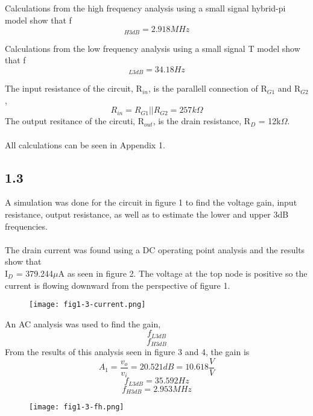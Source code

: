  Calculations from the high frequency analysis using a small signal hybrid-pi model show that f$$_{H 3dB} = 2.918MHz$$

  Calculations from the low frequency analysis using a small signal T model show that f$$_{L 3dB} = 34.18Hz$$

  The input resistance of the circuit, R$_{in}$, is the parallell connection of R$_{G1}$ and R$_{G2}$, $$R_{in} = R_{G1}||R_{G2} = 257k\Omega$$
  The output resitance of the circuti, R$_{out}$, is the drain resistance, R$_D$ = 12k$\Omega$.\\\\

  All calculations can be seen in Appendix 1.\\
\pagebreak
\subsection*{1.3}

  A simulation was done for the circuit in figure 1 to find the voltage gain, input resistance, output resistance, as well as to estimate the lower and upper 3dB frequencies.\\\\

  The drain current was found using a DC operating point analysis and the results show that \\I$_D$ = 379.244$\mu$A as seen in figure 2. The voltage at the top node is positive so the current is flowing downward from the perspective of figure 1.\\

  \begin{figure}[h!]
        \centering
        \texttt{[image: fig1-3-current.png]}
  \end{figure}

\pagebreak

  An AC analysis was used to find the gain, $$f_{L 3dB}$$ $$f_{H 3dB}$$ From the results of this analysis seen in figure 3 and 4, the gain is $$A_1 = \frac{v_o}{v_i} = 20.521 dB = 10.618 \frac{V}{V}$$ $$f_{L 3dB} = 35.592 Hz$$ $$f_{H 3dB} = 2.953MHz$$

  \begin{figure}[h!]
        \centering
        \texttt{[image: fig1-3-fh.png]}
  \end{figure}

